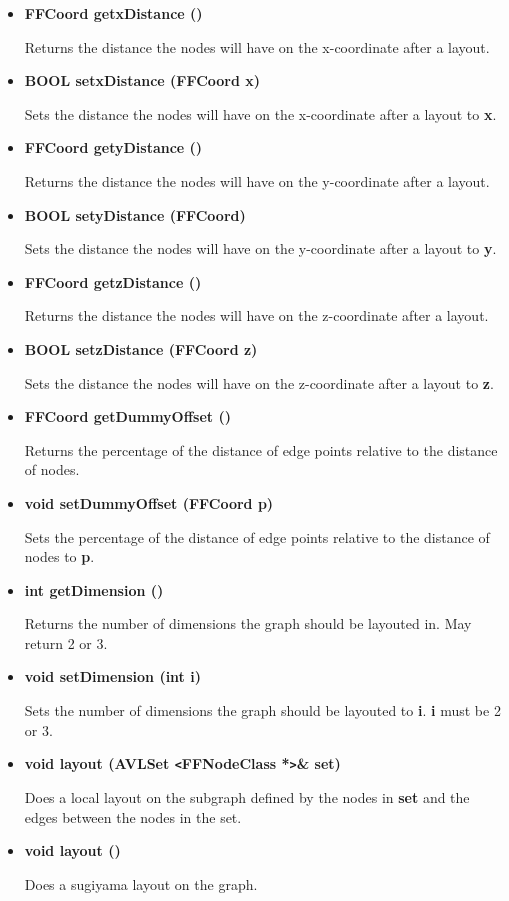 \begin{itemize}
  Sets the lowest z-coordinate the graph may have after a layout
  to {\bf z}.

\item{\bf FFCoord getxDistance ()}
  
  Returns the distance the nodes will have on the x-coordinate
  after a layout.

\item{\bf BOOL setxDistance (FFCoord x)}

  Sets the distance the nodes will have on the x-coordinate
  after a layout to {\bf x}.

\item{\bf FFCoord getyDistance ()}
  
  Returns the distance the nodes will have on the y-coordinate
  after a layout.

\item{\bf BOOL setyDistance (FFCoord)}

  Sets the distance the nodes will have on the y-coordinate
  after a layout to {\bf y}.

\item{\bf FFCoord getzDistance ()}
  
  Returns the distance the nodes will have on the z-coordinate
  after a layout.

\item{\bf BOOL setzDistance (FFCoord z)}

  Sets the distance the nodes will have on the z-coordinate
  after a layout to {\bf z}.
  
\item{\bf FFCoord getDummyOffset ()}
  
  Returns the percentage of the distance of edge points relative
  to the distance of nodes.

\item{\bf void setDummyOffset (FFCoord p)}
  
  Sets the percentage of the distance of edge points relative to
  the distance of nodes to {\bf p}.
  
\item{\bf int getDimension ()}

  Returns the number of dimensions the graph should be layouted in.
  May return 2 or 3.

\item{\bf void setDimension (int i)}
  
  Sets the number of dimensions the graph should be layouted to
  {\bf i}. {\bf i} must be 2 or 3.

\item{\bf void layout (AVLSet \verb|<|FFNodeClass *\verb|>|\& set)}
  
  Does a local layout on the subgraph defined by the nodes in
  {\bf set} and the edges between the nodes in the set.

\item{\bf void layout ()}
  
  Does a sugiyama layout on the graph.

\end{itemize}


